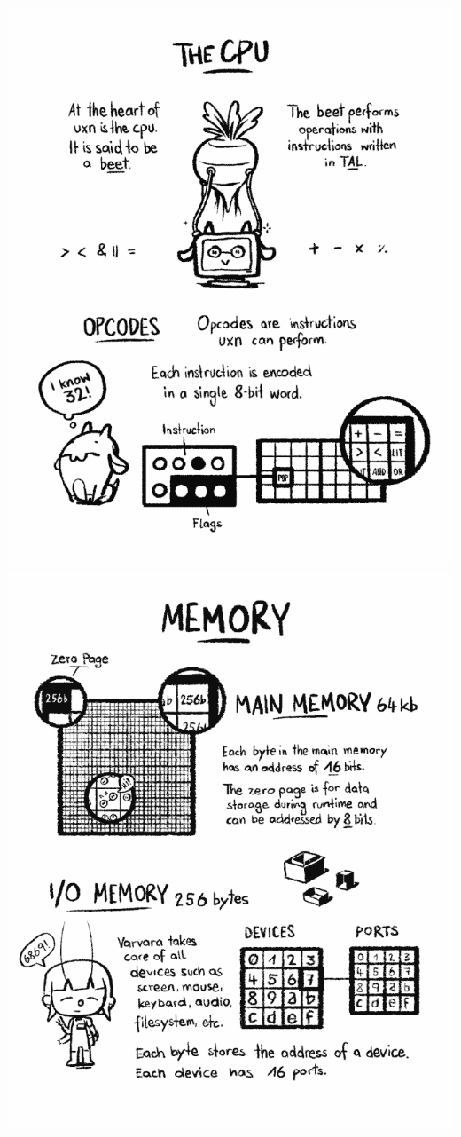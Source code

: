 \documentclass[paperheight=4.25in,paperwidth=2.75in,20pt]{article}
\begin{document}
  \includegraphics[width=1.0\paperwidth]{images/02_cpu-680.png}
  \includegraphics[width=1.0\paperwidth]{images/03_memory-680.png}
\end{document}
